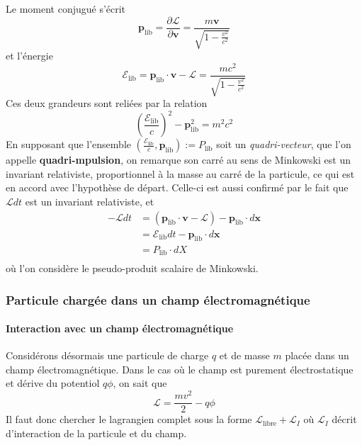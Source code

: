         Le moment conjugué s’écrit 
        \[ \mathbf{p}_{\text{lib}} = \frac{\partial \mathcal{L}}{\partial \mathbf{v}} = \frac{m\mathbf{v}}{\sqrt{1 - \frac{v^2}{c^2}}} \]   
        et l’énergie 
        \[ \mathcal{E}_{\text{lib}} = \mathbf{p}_{\text{lib}} \cdot \mathbf{v} - \mathcal{L} = \frac{mc^2}{\sqrt{1- \frac{v^2}{c^2}}} \]
        Ces deux grandeurs sont reliées par la relation 
        \[ \left(\frac{\mathcal{E}_{\text{lib}}}{c}\right)^2 - \mathbf{p}_{\text{lib}}^2 = m^2 c^2 \]   
        En supposant que l’ensemble $\left(\frac{\mathcal{E}_{\text{lib}}}{c}, \mathbf{p}_{\text{lib}}\right) := P_{\text{lib}}$ soit un \textit{quadri-vecteur}, que l’on appelle \textbf{quadri-mpulsion}, on remarque son carré au sens de Minkowski est un invariant relativiste, proportionnel à la masse au carré de la particule, ce qui est en accord avec l’hypothèse de départ. Celle-ci est aussi confirmé par le fait que $\mathcal{L} dt$ est un invariant relativiste, et
        \begin{align*}
            - \mathcal{L} dt 
            &= \left(\mathbf{p}_{\text{lib}} \cdot \mathbf{v} - \mathcal{L}\right) - \mathbf{p}_{\text{lib}} \cdot d\mathbf{x} \\
            &= \mathcal{E}_{\text{lib}} dt - \mathbf{p}_{\text{lib}} \cdot d\mathbf{x} \\
            &= P_{\text{lib}} \cdot dX \\
        \end{align*}
        où l’on considère le pseudo-produit scalaire de Minkowski.

        \subsubsection{Particule chargée dans un champ électromagnétique}

            \paragraph{Interaction avec un champ électromagnétique}

            Considérons désormais une particule de charge $q$ et de masse $m$ placée dans un champ électromagnétique. Dans le cas où le champ est purement électrostatique et dérive du potentiol $q \phi$, on sait que 
            \[ \mathcal{L} = \frac{mv^2}{2} - q \phi \]
            Il faut donc chercher le lagrangien complet sous la forme $\mathcal{L}_{\text{libre}} + \mathcal{L}_{I}$ où $\mathcal{L}_{I}$ décrit d’interaction de la particule et du champ.